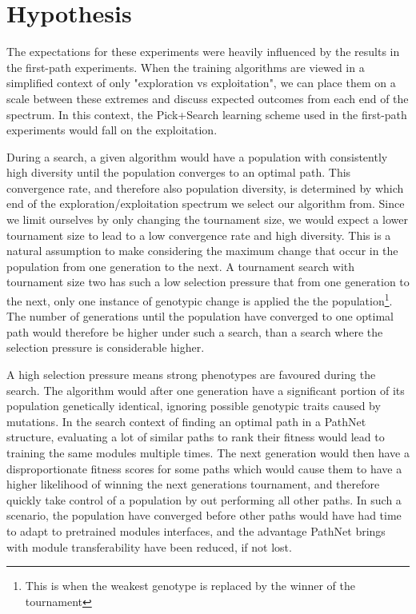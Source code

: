 \section{Hypothesis}\label{Search-hypothesis}
The expectations for these experiments were heavily influenced by the results in the first-path experiments. When the training algorithms are viewed in a simplified context of only "exploration vs exploitation", we can place them on a scale between these extremes and discuss expected outcomes from each end of the spectrum. In this context, the Pick+Search learning scheme used in the first-path experiments would fall on the exploitation.

During a search, a given algorithm would have a population with consistently high diversity until the population converges to an optimal path. This convergence rate, and therefore also population diversity, is determined by which end of the exploration/exploitation spectrum we select our algorithm from. Since we limit ourselves by only changing the tournament size, we would expect a lower tournament size to lead to a low convergence rate and high diversity. This is a natural assumption to make considering the maximum change that occur in the population from one generation to the next. A tournament search with tournament size two has such a low selection pressure that from one generation to the next, only one instance of genotypic change is applied the the population\footnote{This is when the weakest genotype is replaced by the winner of the tournament}. The number of generations until the population have converged to one optimal path would therefore be higher under such a search, than a search where the selection pressure is considerable higher. 

A high selection pressure means strong phenotypes are favoured during the search. The algorithm would after one generation have a significant portion of its population genetically identical, ignoring possible genotypic traits caused by mutations. In the search context of finding an optimal path in a PathNet structure, evaluating a lot of similar paths to rank their fitness would lead to training the same modules multiple times. The next generation would then have a disproportionate fitness scores for some paths which would cause them to have a higher likelihood of winning the next generations tournament, and therefore quickly take control of a population by out performing all other paths. In such a scenario, the population have converged before other paths would have had time to adapt to pretrained modules interfaces, and the advantage PathNet brings with module transferability have been reduced, if not lost.  

